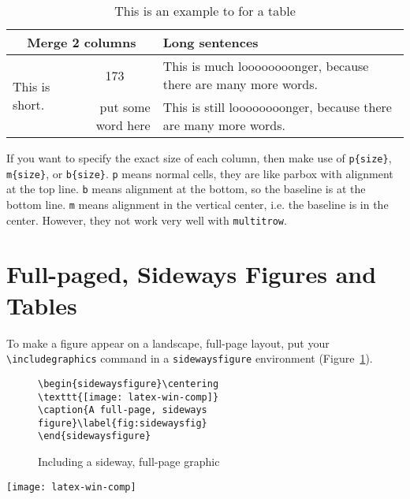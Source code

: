 \begin{table}[H]\centering\singlespacing
	\caption{This is an example to for a table}	\label{tab:tablemulticolumn}
	\begin{tabular}{|l|r|p{7cm}|}
		\hline
		\multicolumn{2}{|c|}{\textbf{Merge 2 columns}} & \textbf{Long sentences} \\ \hline
		\multirow{2}{*}[-4mm]{This is short.} & \multicolumn{1}{c|}{173} & This is much loooooooonger, because there are many more words.  \\ \cline{2-3}
		 & put some word here & This is still loooooooonger, because there are many more words. \\ \hline
	\end{tabular} 
\end{table} 

If you want to specify the exact size of each column, then make use of \verb|p{size}|, \verb|m{size}|, or \verb|b{size}|. \texttt{p} means normal cells, they are like parbox with alignment at the top line. \texttt{b} means alignment at the bottom, so the baseline is at the bottom line. \texttt{m} means alignment in the vertical center, i.e. the baseline is in the center. However, they not work very well with \verb|multitrow|. 

\section{Full-paged, Sideways Figures and Tables}

To make a figure appear on a landscape, full-page layout, put your \verb|\includegraphics| command in a \verb|sidewaysfigure| environment (Figure~\ref{fig:lst:sidewayfigure}).

\begin{figure}[htb!]
\begin{lstlisting}
\begin{sidewaysfigure}\centering
\texttt{[image: latex-win-comp]}
\caption{A full-page, sideways figure}\label{fig:sidewaysfig}
\end{sidewaysfigure}
\end{lstlisting}
\caption{Including a sideway, full-page graphic}\label{fig:lst:sidewayfigure}
\end{figure}

\begin{sidewaysfigure}
\centering\texttt{[image: latex-win-comp]}
\caption{A full-page, sideways figure}\label{fig:sidewaysfig}
\end{sidewaysfigure}

